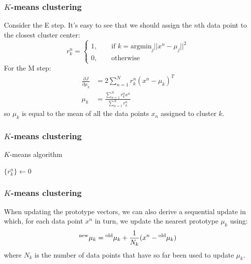 \documentclass{beamer}
\begin{document}
\begin{frame}
    \frametitle{$K$-means clustering}
    Consider the E step. It's easy to see that we should assign the $n$th data point to the closest cluster center:
    \begin{equation*}
        r^{n}_{k}=\begin{cases}
            1,\qquad\textrm{if }k=\mathrm{argmin}_{j}||x^{n}-\mu_{j}||^{2} \\
            0,\qquad\textrm{otherwise}
        \end{cases}
    \end{equation*}
    For the M step:
    \begin{align*}
        \frac{\partial{}J}{\partial{}\mu_{k}}&=2\sum_{n=1}^{N}r^{n}_{k}(x^{n}-\mu_{k})^{T} \\
        \mu_{k}&=\frac{\sum_{n=1}^{N}r^{n}_{k}x^{n}}{\sum_{n=1}^{N}r^{n}_{k}}
    \end{align*}
    so $\mu_{k}$ is equal to the mean of all the data points $x_{n}$ assigned to cluster $k$.
\end{frame}

\begin{frame}
    \frametitle{$K$-means clustering}
    \begin{algorithm}[H]
        \caption{$K$-means algorithm}
        $\{r^{n}_{k}\}\gets{}0$\;
        \;
    \end{algorithm}
\end{frame}

\begin{frame}
    \frametitle{$K$-means clustering}
    When updating the prototype vectors, we can also derive a sequential update in which, for each data point $x^{n}$ in turn, we update the nearest prototype $\mu_{k}$ using:
    \begin{equation*}
        \prescript{\textrm{new}}{}{\mu}_{k}=\prescript{\textrm{old}}{}{\mu}_{k}+\frac{1}{N_{k}}(x^{n}-\prescript{\textrm{old}}{}{\mu}_{k})
    \end{equation*}
    where $N_{k}$ is the number of data points that have so far been used to update $\mu_{k}$.
\end{frame}
\end{document}
